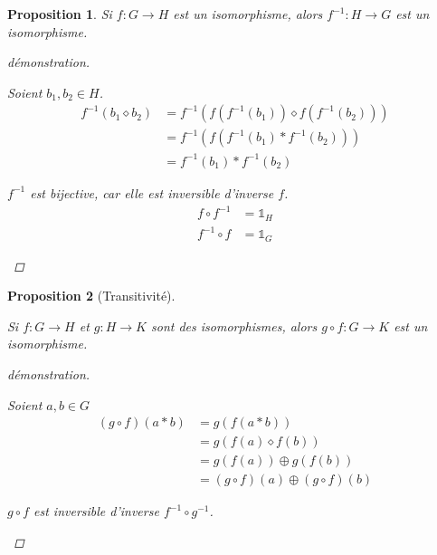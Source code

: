 \documentclass{report}
\newtheorem*{prop}{Proposition}
\theoremstyle{definition}
\theoremstyle{remark}
\begin{document}
	\begin{prop}
		Si $f:G \to H$ est un isomorphisme, alors $f^{-1}:H \to G$ est un isomorphisme.
		\begin{proof}[d\'emonstration]~

			\begin{nlist}
				\item Soient $b_1,b_2 \in H$.
				\begin{align*}
					f^{-1}(b_1 \diamond b_2)&= f^{-1}(f(f^{-1}(b_1)) \diamond f(f^{-1}(b_2)))\\
					&= f^{-1}(f(f^{-1}(b_1) * f^{-1}(b_2)))\\
					&= f^{-1}(b_1) * f^{-1}(b_2)
				\end{align*}
				\item $f^{-1}$ est bijective, car elle est inversible d'inverse $f$.
				\begin{align*}
					f \circ f^{-1}&= \mathds{1}_H\\
					f^{-1} \circ f&= \mathds{1}_G
				\end{align*}
			\end{nlist}
		\end{proof}
	\end{prop}
	\begin{prop}[Transitivit\'e]~

		Si $f:G \to H$ et $g:H \to K$ sont des isomorphismes, alors $g \circ f:G \to K$ est un isomorphisme.
		\begin{proof}[d\'emonstration]~

			\begin{nlist}
				\item Soient $a,b \in G$
				\begin{align*}
					(g \circ f)(a*b)&= g(f(a*b))\\
					&= g(f(a) \diamond f(b))\\
					&= g(f(a)) \oplus g(f(b))\\
					&= (g \circ f)(a) \oplus (g \circ f)(b)
				\end{align*}
				\item $g \circ f$ est inversible d'inverse $f^{-1} \circ g^{-1}$.
			\end{nlist}
		\end{proof}
	\end{prop}
\end{document}
